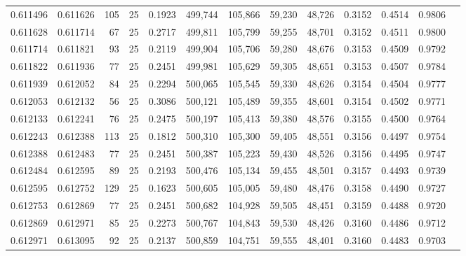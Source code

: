 \begin{tabular}{rrrrrrrrrrrrr}
0.611496 & 0.611626 &   105 &  25 &                                     0.1923 & 499,744 & 105,866 &  59,230 &  48,726 & 0.3152 & 0.4514 & 0.9806 \\
0.611628 & 0.611714 &    67 &  25 &                                     0.2717 & 499,811 & 105,799 &  59,255 &  48,701 & 0.3152 & 0.4511 & 0.9800 \\
0.611714 & 0.611821 &    93 &  25 &                                     0.2119 & 499,904 & 105,706 &  59,280 &  48,676 & 0.3153 & 0.4509 & 0.9792 \\
0.611822 & 0.611936 &    77 &  25 &                                     0.2451 & 499,981 & 105,629 &  59,305 &  48,651 & 0.3153 & 0.4507 & 0.9784 \\
0.611939 & 0.612052 &    84 &  25 &                                     0.2294 & 500,065 & 105,545 &  59,330 &  48,626 & 0.3154 & 0.4504 & 0.9777 \\
0.612053 & 0.612132 &    56 &  25 &                                     0.3086 & 500,121 & 105,489 &  59,355 &  48,601 & 0.3154 & 0.4502 & 0.9771 \\
0.612133 & 0.612241 &    76 &  25 &                                     0.2475 & 500,197 & 105,413 &  59,380 &  48,576 & 0.3155 & 0.4500 & 0.9764 \\
0.612243 & 0.612388 &   113 &  25 &                                     0.1812 & 500,310 & 105,300 &  59,405 &  48,551 & 0.3156 & 0.4497 & 0.9754 \\
0.612388 & 0.612483 &    77 &  25 &                                     0.2451 & 500,387 & 105,223 &  59,430 &  48,526 & 0.3156 & 0.4495 & 0.9747 \\
0.612484 & 0.612595 &    89 &  25 &                                     0.2193 & 500,476 & 105,134 &  59,455 &  48,501 & 0.3157 & 0.4493 & 0.9739 \\
0.612595 & 0.612752 &   129 &  25 &                                     0.1623 & 500,605 & 105,005 &  59,480 &  48,476 & 0.3158 & 0.4490 & 0.9727 \\
0.612753 & 0.612869 &    77 &  25 &                                     0.2451 & 500,682 & 104,928 &  59,505 &  48,451 & 0.3159 & 0.4488 & 0.9720 \\
0.612869 & 0.612971 &    85 &  25 &                                     0.2273 & 500,767 & 104,843 &  59,530 &  48,426 & 0.3160 & 0.4486 & 0.9712 \\
0.612971 & 0.613095 &    92 &  25 &                                     0.2137 & 500,859 & 104,751 &  59,555 &  48,401 & 0.3160 & 0.4483 & 0.9703 \\

\end{tabular}
